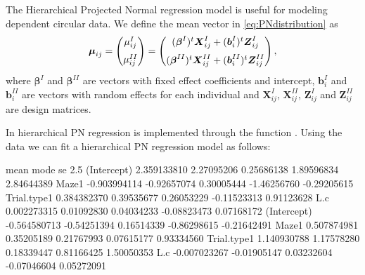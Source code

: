 The Hierarchical Projected Normal regression model
\citep{nunez2014bayesian} is useful for modeling dependent circular
data. We define the mean vector in \eqref{eq:PNdistribution} as
\begin{equation}
\boldsymbol{\mu}_{ij} = \begin{pmatrix}
  \mu_{ij}^{I}  \vspace{0.2cm}  \\
\mu_{ij}^{II}
 \end{pmatrix}=\begin{pmatrix}
  (\boldsymbol{\beta}^{I})^{t}\boldsymbol{X}_{ij}^{I} + (\boldsymbol{b}_i^{I})^t\boldsymbol{Z}_{ij}^{I} \vspace{0.2cm}  \\
  (\boldsymbol{\beta}^{II})^{t}\boldsymbol{X}_{ij}^{II} + (\boldsymbol{b}_i^{II})^t\boldsymbol{Z}_{ij}^{II}
 \end{pmatrix},
\end{equation} where \(\boldsymbol{\beta}^{I}\) and
\(\boldsymbol{\beta}^{II}\) are vectors with fixed effect coefficients
and intercept, \(\boldsymbol{b}_{i}^{I}\) and
\(\boldsymbol{b}_{i}^{II}\) are vectors with random effects for each
individual and \(\boldsymbol{X}_{ij}^{I}\),
\(\boldsymbol{X}_{ij}^{II}\), \(\boldsymbol{Z}_{ij}^{I}\) and
\(\boldsymbol{Z}_{ij}^{II}\) are design matrices.

In  hierarchical PN regression is implemented through the
function . Using the  data
\citep{Warren2017} we can fit a hierarchical PN regression model as
follows:

\begin{CodeChunk}


\begin{CodeOutput}
                    mean        mode         se        2.5%
(Intercept)  2.359133810  2.27095206 0.25686138  1.89596834  2.84644389
Maze1       -0.903994114 -0.92657074 0.30005444 -1.46256760 -0.29205615
Trial.type1  0.384382370  0.39535677 0.26053229 -0.11523313  0.91123628
L.c          0.002273315  0.01092830 0.04034233 -0.08823473  0.07168172
(Intercept) -0.564580713 -0.54251394 0.16514339 -0.86298615 -0.21642491
Maze1        0.507874981  0.35205189 0.21767993  0.07615177  0.93334560
Trial.type1  1.140930788  1.17578280 0.18339447  0.81166425  1.50050353
L.c         -0.007023267 -0.01905147 0.03232604 -0.07046604  0.05272091
\end{CodeOutput}
\end{CodeChunk}

